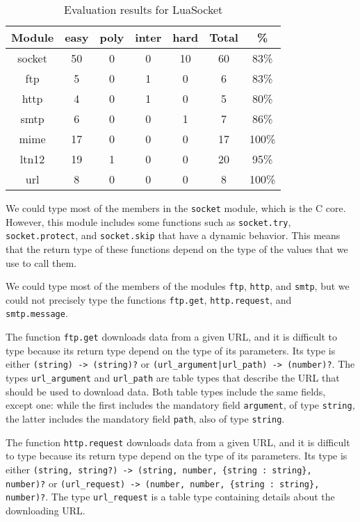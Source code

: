 \begin{table}[!ht]
\begin{center}
\begin{tabular}{|c|c|c|c|c|c|c|}
\hline
\textbf{Module} & \textbf{easy} & \textbf{poly} & \textbf{inter} & \textbf{hard} & \textbf{Total} & \textbf{\%} \\
\hline
socket & 50 & 0 & 0 & 10 & 60 & 83\% \\
\hline
ftp & 5 & 0 & 1 & 0 & 6 & 83\% \\
\hline
http & 4 & 0 & 1 & 0 & 5 & 80\% \\
\hline
smtp & 6 & 0 & 0 & 1 & 7 & 86\% \\
\hline
mime & 17 & 0 & 0 & 0 & 17 & 100\% \\
\hline
ltn12 & 19 & 1 & 0 & 0 & 20 & 95\% \\
\hline
url & 8 & 0 & 0 & 0 & 8 & 100\% \\
\hline
\end{tabular}
\end{center}
\caption{Evaluation results for LuaSocket}
\label{tab:evalsocket}
\end{table}

We could type most of the members in the \texttt{socket} module,
which is the C core.
However, this module includes some functions such as
\texttt{socket.try}, \texttt{socket.protect}, and \texttt{socket.skip}
that have a dynamic behavior.
This means that the return type of these functions depend on the
type of the values that we use to call them.

We could type most of the members of the modules \texttt{ftp},
\texttt{http}, and \texttt{smtp}, but we could not precisely type
the functions \texttt{ftp.get}, \texttt{http.request}, and
\texttt{smtp.message}.

The function \texttt{ftp.get} downloads data from a given URL,
and it is difficult to type because its return type depend on
the type of its parameters.
Its type is either \texttt{(string) -> (string)?} or
\texttt{(url\string_argument|url\string_path) -> (number)?}.
The types \texttt{url\string_argument} and \texttt{url\string_path}
are table types that describe the URL that should be used to
download data.
Both table types include the same fields, except one:
while the first includes the mandatory field \texttt{argument},
of type \texttt{string}, the latter includes the mandatory field
\texttt{path}, also of type \texttt{string}.

The function \texttt{http.request} downloads data from a given URL,
and it is difficult to type because its return type depend on
the type of its parameters.
Its type is either
\texttt{(string, string?) -> (string, number, \{string : string\}, number)?} or
\texttt{(url\string_request) -> (number, number, \{string : string\}, number)?}.
The type \texttt{url\string_request} is a table type containing
details about the downloading URL.

